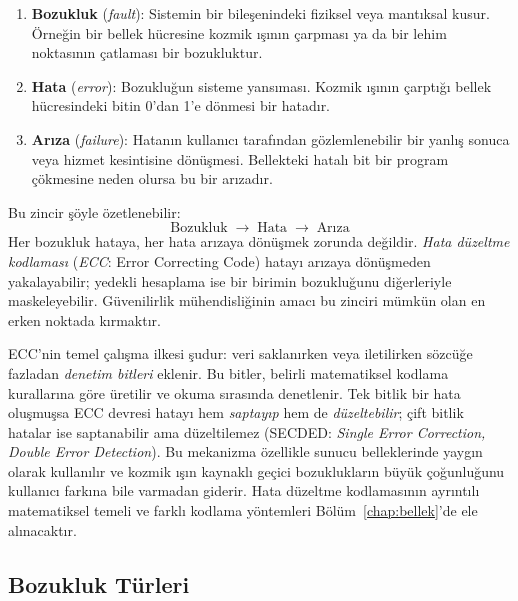 \begin{enumerate}
    \item \textbf{Bozukluk} (\emph{fault}): Sistemin bir bileşenindeki fiziksel veya mantıksal kusur. Örneğin bir bellek hücresine kozmik ışının çarpması ya da bir lehim noktasının çatlaması bir bozukluktur.
    \item \textbf{Hata} (\emph{error}): Bozukluğun sisteme yansıması. Kozmik ışının çarptığı bellek hücresindeki bitin 0'dan 1'e dönmesi bir hatadır.
    \item \textbf{Arıza} (\emph{failure}): Hatanın kullanıcı tarafından gözlemlenebilir bir yanlış sonuca veya hizmet kesintisine dönüşmesi. Bellekteki hatalı bit bir program çökmesine neden olursa bu bir arızadır.
\end{enumerate}

Bu zincir şöyle özetlenebilir:
%
\[
\text{Bozukluk} \;\longrightarrow\; \text{Hata} \;\longrightarrow\; \text{Arıza}
\]
%
Her bozukluk hataya, her hata arızaya dönüşmek zorunda değildir. \emph{Hata düzeltme kodlaması} (\emph{ECC}: Error Correcting Code) hatayı arızaya dönüşmeden yakalayabilir; yedekli hesaplama ise bir birimin bozukluğunu diğerleriyle maskeleyebilir. Güvenilirlik mühendisliğinin amacı bu zinciri mümkün olan en erken noktada kırmaktır.

ECC'nin temel çalışma ilkesi şudur: veri saklanırken veya iletilirken sözcüğe fazladan \emph{denetim bitleri} eklenir. Bu bitler, belirli matematiksel kodlama kurallarına göre üretilir ve okuma sırasında denetlenir. Tek bitlik bir hata oluşmuşsa ECC devresi hatayı hem \emph{saptayıp} hem de \emph{düzeltebilir}; çift bitlik hatalar ise saptanabilir ama düzeltilemez (SECDED: \emph{Single Error Correction, Double Error Detection}). Bu mekanizma özellikle sunucu belleklerinde yaygın olarak kullanılır ve kozmik ışın kaynaklı geçici bozuklukların büyük çoğunluğunu kullanıcı farkına bile varmadan giderir. Hata düzeltme kodlamasının ayrıntılı matematiksel temeli ve farklı kodlama yöntemleri Bölüm~\ref{chap:bellek}'de ele alınacaktır.

\subsection{Bozukluk Türleri}
\label{subsec:bozukluk-turleri}

